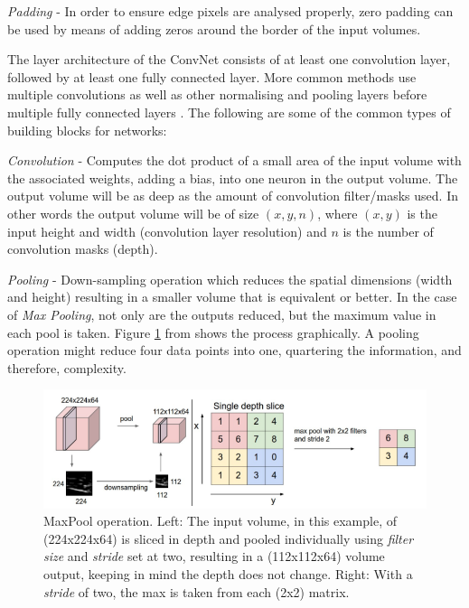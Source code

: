 \documentclass[fleqn,twoside,12pt]{report}
\begin{document}
\textit{Padding} - In order to ensure edge pixels are analysed properly, zero padding can be used by means of adding zeros around the border of the input volumes.  

The layer architecture of the ConvNet consists of at least one convolution layer, followed by at least one fully connected layer. More common methods use multiple convolutions as well as other normalising and pooling layers before multiple fully connected layers \cite{krizhevsky,ciresan}. The following are some of the common types of building blocks for networks: 

\textit{Convolution} - Computes the dot product of a small area of the input volume with the associated weights, adding a bias, into one neuron in the output volume. The output volume will be as deep as the amount of convolution filter/masks used. In other words the output volume will be of size $(x,y,n)$, where $(x,y)$ is the input height and width (convolution layer resolution) and $n$ is the number of convolution masks (depth).

\textit{Pooling} - Down-sampling operation which reduces the spatial dimensions (width and height) resulting in a smaller volume that is equivalent or better. In the case of \textit{Max Pooling}, not only are the outputs reduced, but the maximum value in each pool is taken. Figure \ref{fig:maxpool} from \cite{andrej} shows the process graphically. A pooling operation might reduce four data points into one, quartering the information, and therefore, complexity.

\begin{figure}[h]
	\centering
	\includegraphics[width=\textwidth]{maxpool.png}
	\caption{MaxPool operation. Left: The input volume, in this example, of (224x224x64) is sliced in depth and pooled individually using \textit{filter size} and \textit{stride} set at two, resulting in a (112x112x64) volume output, keeping in mind the depth does not change. Right: With a \textit{stride} of two, the max is taken from each (2x2) matrix.}
	\label{fig:maxpool}
\end{figure}
\end{document}
